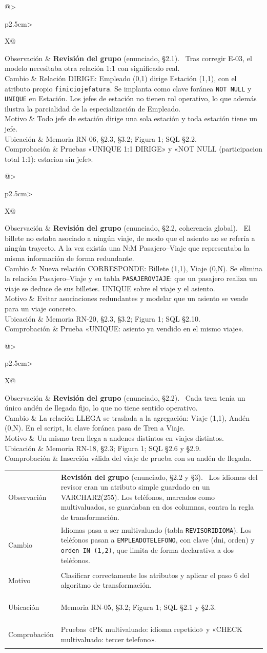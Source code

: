 \documentclass[11pt,a4paper]{article}
\makeatletter
\DeclareRobustCommand{\_}{\textunderscore\allowbreak}
\newcommand{\tb}[1]{\texttt{#1}}
\newcommand{\REV}[1]{\textbf{Revisión del grupo} (enunciado, #1).~}
\newcommand{\cambio}[7]{%
\begin{tcolorbox}[colback=white,colframe=azuluvigo,colbacktitle=azuluvigo!8,coltitle=azuluvigo,
  title={\textbf{#1}\quad #2},fonttitle=\normalsize,boxrule=0.6pt,arc=1mm,
  left=2mm,right=2mm,top=1mm,bottom=1mm,before skip=6pt,after skip=6pt]
\small
\begin{tabularx}{\linewidth}{@{}>{\bfseries\raggedright\arraybackslash}p{2.5cm}>{\raggedright\arraybackslash}X@{}}
Observación & #3\\
Cambio & #4\\
Motivo & #5\\
Ubicación & #6\\
Comprobación & #7\\
\end{tabularx}
\end{tcolorbox}}
\makeatother
\begin{document}
\cambio{E-04}{Nueva relación 1:1 DIRIGE}
{\REV{§2.1} Tras corregir E-03, el modelo necesitaba otra relación 1:1 con significado real.}
{Relación DIRIGE: Empleado (0,1) dirige Estación (1,1), con el atributo propio \tb{f\_inicio\_jefatura}. Se implanta como clave foránea \tb{NOT NULL} y \tb{UNIQUE} en Estación. Los jefes de estación no tienen rol operativo, lo que además ilustra la parcialidad de la especialización de Empleado.}
{Todo jefe de estación dirige una sola estación y toda estación tiene un jefe.}
{Memoria RN-06, §2.3, §3.2; Figura 1; SQL §2.2.}
{Pruebas «UNIQUE 1:1 DIRIGE» y «NOT NULL (participacion total 1:1): estacion sin jefe».}

\cambio{E-05}{Billete ligado al viaje}
{\REV{§2.2, coherencia global} El billete no estaba asociado a ningún viaje, de modo que el asiento no se refería a ningún trayecto. A la vez existía una N:M Pasajero–Viaje que representaba la misma información de forma redundante.}
{Nueva relación CORRESPONDE: Billete (1,1), Viaje (0,N). Se elimina la relación Pasajero–Viaje y su tabla \tb{PASAJERO\_VIAJE}: que un pasajero realiza un viaje se deduce de sus billetes. UNIQUE sobre el viaje y el asiento.}
{Evitar asociaciones redundantes y modelar que un asiento se vende para un viaje concreto.}
{Memoria RN-20, §2.3, §3.2; Figura 1; SQL §2.10.}
{Prueba «UNIQUE: asiento ya vendido en el mismo viaje».}

\cambio{E-06}{Llegada a andén desde el viaje}
{\REV{§2.2} Cada tren tenía un único andén de llegada fijo, lo que no tiene sentido operativo.}
{La relación LLEGA se traslada a la agregación: Viaje (1,1), Andén (0,N). En el script, la clave foránea pasa de Tren a Viaje.}
{Un mismo tren llega a andenes distintos en viajes distintos.}
{Memoria RN-18, §2.3; Figura 1; SQL §2.6 y §2.9.}
{Inserción válida del viaje de prueba con su andén de llegada.}

\cambio{E-07}{Atributos multivaluados}
{\REV{§2.2 y §3} Los idiomas del revisor eran un atributo simple guardado en un VARCHAR2(255). Los teléfonos, marcados como multivaluados, se guardaban en dos columnas, contra la regla de transformación.}
{Idiomas pasa a ser multivaluado (tabla \tb{REVISOR\_IDIOMA}). Los teléfonos pasan a \tb{EMPLEADO\_TELEFONO}, con clave (dni, orden) y \tb{orden IN (1,2)}, que limita de forma declarativa a dos teléfonos.}
{Clasificar correctamente los atributos y aplicar el paso 6 del algoritmo de transformación.}
{Memoria RN-05, §3.2; Figura 1; SQL §2.1 y §2.3.}
{Pruebas «PK multivaluado: idioma repetido» y «CHECK multivaluado: tercer telefono».}
\end{document}
